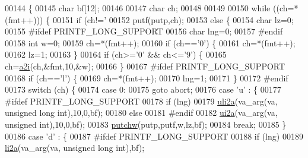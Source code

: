 \begin{DoxyCode}
00144     \{
00145     \textcolor{keywordtype}{char} bf[12];
00146     
00147     \textcolor{keywordtype}{char} ch;
00148 
00149 
00150     \textcolor{keywordflow}{while} ((ch=*(fmt++))) \{
00151         \textcolor{keywordflow}{if} (ch!=\textcolor{charliteral}{'%
00152             putf(putp,ch);
00153         \textcolor{keywordflow}{else} \{
00154             \textcolor{keywordtype}{char} lz=0;
00155 \textcolor{preprocessor}{#ifdef  PRINTF\_LONG\_SUPPORT}
00156             \textcolor{keywordtype}{char} lng=0;
00157 \textcolor{preprocessor}{#endif}
00158             \textcolor{keywordtype}{int} w=0;
00159             ch=*(fmt++);
00160             \textcolor{keywordflow}{if} (ch==\textcolor{charliteral}{'0'}) \{
00161                 ch=*(fmt++);
00162                 lz=1;
00163                 \}
00164             \textcolor{keywordflow}{if} (ch>=\textcolor{charliteral}{'0'} && ch<=\textcolor{charliteral}{'9'}) \{
00165                 ch=\hyperlink{a00043_aeadd3398ed3a27d05fd6638133feb559}{a2i}(ch,&fmt,10,&w);
00166                 \}
00167 \textcolor{preprocessor}{#ifdef  PRINTF\_LONG\_SUPPORT}
00168             \textcolor{keywordflow}{if} (ch==\textcolor{charliteral}{'l'}) \{
00169                 ch=*(fmt++);
00170                 lng=1;
00171             \}
00172 \textcolor{preprocessor}{#endif}
00173             \textcolor{keywordflow}{switch} (ch) \{
00174                 \textcolor{keywordflow}{case} 0: 
00175                     \textcolor{keywordflow}{goto} abort;
00176                 \textcolor{keywordflow}{case} \textcolor{charliteral}{'u'} : \{
00177 \textcolor{preprocessor}{#ifdef  PRINTF\_LONG\_SUPPORT}
00178                     \textcolor{keywordflow}{if} (lng)
00179                         \hyperlink{a00043_ac8448f6a2ace7b25fc6fbd5561fe5e75}{uli2a}(va\_arg(va, \textcolor{keywordtype}{unsigned} \textcolor{keywordtype}{long} \textcolor{keywordtype}{int}),10,0,bf);
00180                     \textcolor{keywordflow}{else}
00181 \textcolor{preprocessor}{#endif}
00182                     \hyperlink{a00043_ae17e69308453bdacaa3b6475d441aa7b}{ui2a}(va\_arg(va, \textcolor{keywordtype}{unsigned} \textcolor{keywordtype}{int}),10,0,bf);
00183                     \hyperlink{a00043_a231c14785d57435ad9cba03d6623c75c}{putchw}(putp,putf,w,lz,bf);
00184                     \textcolor{keywordflow}{break};
00185                     \}
00186                 \textcolor{keywordflow}{case} \textcolor{charliteral}{'d'} :  \{
00187 \textcolor{preprocessor}{#ifdef  PRINTF\_LONG\_SUPPORT}
00188                     \textcolor{keywordflow}{if} (lng)
00189                         \hyperlink{a00043_a3e55a1e7928695ff7713544a808c3fce}{li2a}(va\_arg(va, \textcolor{keywordtype}{unsigned} \textcolor{keywordtype}{long} \textcolor{keywordtype}{int}),bf);
}
\end{DoxyCode}
